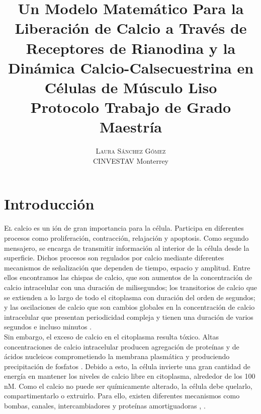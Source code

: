 \documentclass[draft]{article}
\title{Un Modelo Matemático Para la Liberación de Calcio a Través de Receptores de Rianodina y la Dinámica Calcio-Calsecuestrina en Células de Músculo Liso \\  \Large Protocolo Trabajo de Grado Maestría}
\author{%
\textsc{Laura Sánchez Gómez} \\ %
\normalsize CINVESTAV Monterrey \\ %
} %
\begin{document}
\maketitle


\section{Introducción}

\lettrine[nindent=0em,lines=3]{E}
l calcio es un ión de gran importancia para la célula. Participa en diferentes procesos como proliferación, contracción, relajación y apoptosis. Como segundo mensajero, se encarga de transmitir información al interior de la célula desde la superficie. Dichos procesos son regulados por calcio mediante diferentes mecanismos de señalización que dependen de tiempo, espacio y amplitud. Entre ellos encontramos las chispas de calcio, que son aumentos de la concentración de calcio intracelular con una duración de milisegundos; los transitorios de calcio que se extienden a lo largo de todo el citoplasma con duración del orden de segundos; y las oscilaciones de calcio que son cambios globales en la concentración de calcio intracelular que presentan periodicidad compleja y tienen una duración de varios segundos e incluso minutos \cite{Perez-Rosas2016}. \\

Sin embargo, el exceso de calcio en el citoplasma resulta tóxico. Altas concentraciones de calcio intracelular producen agregación de proteínas y de ácidos nucleicos comprometiendo la membrana plasmática y produciendo precipitación de fosfatos \cite{Perez-Rosas2016}. Debido a esto, la célula invierte una gran cantidad de energía en mantener los niveles de calcio libre en citoplasma, alrededor de los 100 nM. Como el calcio no puede ser químicamente alterado, la célula debe quelarlo, compartimentarlo o extruirlo. Para ello, existen diferentes mecanismos  como bombas, canales, intercambiadores y proteínas amortiguadoras \cite{Carafoli2003}, \cite{Clapham2007}. \\
\end{document}

